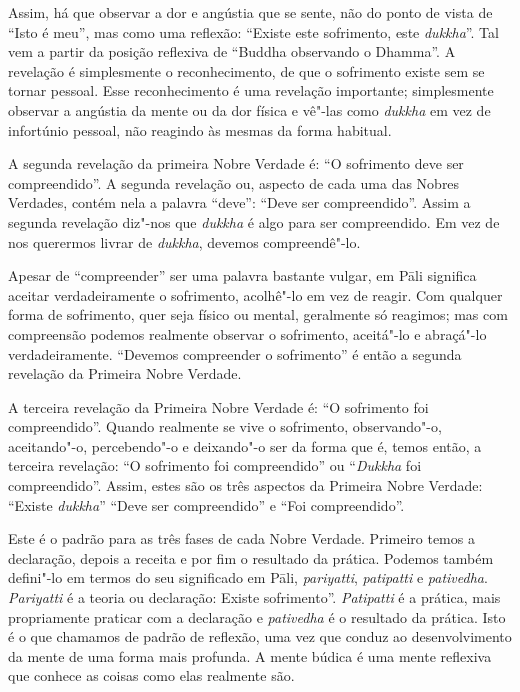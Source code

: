 Assim, há que observar a dor e angústia que se sente, não do ponto de vista de
“Isto é meu”, mas como uma reflexão: “Existe este sofrimento, este
\emph{dukkha}”. Tal vem a partir da posição reflexiva de “Buddha observando o
Dhamma”. A revelação é simplesmente o reconhecimento, de que o sofrimento existe
sem se tornar pessoal. Esse reconhecimento é uma revelação importante;
simplesmente observar a angústia da mente ou da dor física e vê"-las como
\emph{dukkha} em vez de infortúnio pessoal, não reagindo às mesmas da forma
habitual.

A segunda revelação da primeira Nobre Verdade é: “O sofrimento deve ser
compreendido”. A segunda revelação ou, aspecto de cada uma das Nobres Verdades,
contém nela a \mbox{palavra} “deve”: “Deve ser compreendido”. Assim a segunda revelação
diz"-nos que \emph{dukkha} é algo para ser compreendido. Em vez de nos querermos livrar
de \emph{dukkha}, devemos \mbox{compreendê"-lo}.

Apesar de “compreender” ser uma palavra bastante vulgar, em Pāli significa
aceitar verdadeiramente o sofrimento, acolhê"-lo em vez de reagir. Com qualquer
forma de sofrimento, quer seja físico ou mental, geralmente só reagimos; mas com
compreensão podemos realmente observar o sofrimento, aceitá"-lo e abraçá"-lo
verdadeiramente. “Devemos compreender o sofrimento” é então a segunda revelação
da Primeira Nobre Verdade.

A terceira revelação da Primeira Nobre Verdade é: “O sofrimento foi
compreendido”. Quando realmente se vive o sofrimento, observando"-o, aceitando"-o,
percebendo"-o e deixando"-o ser da forma que é, temos então, a terceira revelação:
“O sofrimento foi compreendido” ou “\emph{Dukkha} foi compreendido”. Assim,
estes são os três aspectos da Primeira Nobre Verdade: “Existe \emph{dukkha}”
“Deve ser compreendido” e “Foi compreendido”.

\sectionBreak

Este é o padrão para as três fases de cada Nobre Verdade. Primeiro temos a
declaração, depois a receita e por fim o resultado da prática. Podemos também
defini"-lo em termos do seu significado em Pāli, \emph{pariyatti},
\emph{patipatti} e \emph{pativedha}. \emph{Pariyatti} é a teoria ou declaração:
Existe sofrimento”. \emph{Patipatti} é a prática, mais propriamente praticar com
a declaração e \emph{pativedha} é o resultado da prática. Isto é o que chamamos
de padrão de reflexão, uma vez que conduz ao desenvolvimento da mente de uma
forma mais profunda. A mente búdica é uma mente reflexiva que conhece as coisas
como elas realmente são.

